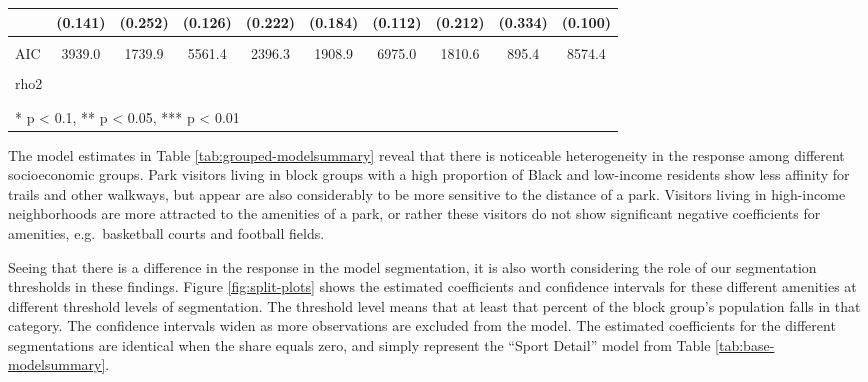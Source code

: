 \documentclass[3p, authoryear]{elsarticle} %
\begin{document}
\begin{landscape}
\begin{table}
{\begin{tabular}[t]{lccccccccc}
 & (0.141) & (0.252) & (0.126) & (0.222) & (0.184) & (0.112) & (0.212) & (0.334) & (0.100)\\
\midrule
\cellcolor{gray!6}{Num.Obs.} & \cellcolor{gray!6}{1365} & \cellcolor{gray!6}{579} & \cellcolor{gray!6}{2027} & \cellcolor{gray!6}{777} & \cellcolor{gray!6}{758} & \cellcolor{gray!6}{2436} & \cellcolor{gray!6}{544} & \cellcolor{gray!6}{358} & \cellcolor{gray!6}{3069}\\
AIC & 3939.0 & 1739.9 & 5561.4 & 2396.3 & 1908.9 & 6975.0 & 1810.6 & 895.4 & 8574.4\\
\cellcolor{gray!6}{Log.Lik.} & \cellcolor{gray!6}{-1959.519} & \cellcolor{gray!6}{-859.966} & \cellcolor{gray!6}{-2770.689} & \cellcolor{gray!6}{-1188.142} & \cellcolor{gray!6}{-944.432} & \cellcolor{gray!6}{-3477.497} & \cellcolor{gray!6}{-895.280} & \cellcolor{gray!6}{-437.678} & \cellcolor{gray!6}{-4277.200}\\
rho2 &  &  &  &  &  &  &  &  & \\
\cellcolor{gray!6}{rho20} & \cellcolor{gray!6}{0.401} & \cellcolor{gray!6}{0.381} & \cellcolor{gray!6}{0.430} & \cellcolor{gray!6}{0.362} & \cellcolor{gray!6}{0.480} & \cellcolor{gray!6}{0.405} & \cellcolor{gray!6}{0.314} & \cellcolor{gray!6}{0.490} & \cellcolor{gray!6}{0.419}\\
\bottomrule
\multicolumn{10}{l}{\textsuperscript{} * p < 0.1, ** p < 0.05, *** p < 0.01}\\
\end{tabular}}
\end{table}
\end{landscape}

The model estimates in Table \ref{tab:grouped-modelsummary} reveal that there
is noticeable heterogeneity in the response among different socioeconomic
groups. Park visitors living in block groups with a high proportion of Black and
low-income residents show less affinity for trails and other walkways, but
appear are also considerably to be more sensitive to the distance of a park.
Visitors living in high-income neighborhoods are more attracted to the amenities
of a park, or rather these visitors do not show significant negative
coefficients for amenities, e.g.~basketball courts and football fields.

Seeing that there is a difference in the response in the model segmentation,
it is also worth considering the role of our segmentation thresholds in these
findings. Figure \ref{fig:split-plots} shows the estimated coefficients and
confidence intervals for these different amenities at different threshold levels
of segmentation. The threshold level means that at least that percent
of the block group's population falls in that category. The confidence intervals
widen as more observations are excluded from the model. The estimated coefficients
for the different segmentations are identical when the share equals zero, and
simply represent the ``Sport Detail'' model from Table \ref{tab:base-modelsummary}.
\end{document}
